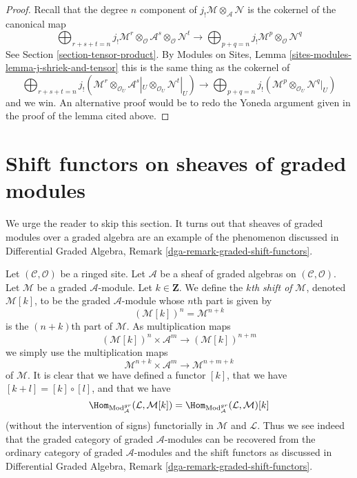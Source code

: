 \begin{proof}
Recall that the degree $n$ component of
$j_!\mathcal{M} \otimes_\mathcal{A} \mathcal{N}$ is the cokernel of
the canonical map
$$
\bigoplus\nolimits_{r + s + t = n}
j_!\mathcal{M}^r \otimes_\mathcal{O}
\mathcal{A}^s \otimes_\mathcal{O}
\mathcal{N}^t
\longrightarrow
\bigoplus\nolimits_{p + q = n}
j_!\mathcal{M}^p \otimes_\mathcal{O} \mathcal{N}^q
$$
See Section \ref{section-tensor-product}.
By Modules on Sites, Lemma \ref{sites-modules-lemma-j-shriek-and-tensor}
this is the same thing as the cokernel of
$$
\bigoplus\nolimits_{r + s + t = n}
j_!(\mathcal{M}^r \otimes_{\mathcal{O}_U}
\mathcal{A}^s|_U \otimes_{\mathcal{O}_U}
\mathcal{N}^t|_U)
\longrightarrow
\bigoplus\nolimits_{p + q = n}
j_!(\mathcal{M}^p \otimes_{\mathcal{O}_U} \mathcal{N}^q|_U)
$$
and we win. An alternative proof would be to redo the Yoneda
argument given in the proof of the lemma cited above.
\end{proof}








\section{Shift functors on sheaves of graded modules}
\label{section-shift}

\noindent
We urge the reader to skip this section. It turns out that sheaves
of graded modules over a graded algebra are an example of the phenomenon
discussed in
Differential Graded Algebra, Remark \ref{dga-remark-graded-shift-functors}.

\medskip\noindent
Let $(\mathcal{C}, \mathcal{O})$ be a ringed site.
Let $\mathcal{A}$ be a sheaf of graded algebras
on $(\mathcal{C}, \mathcal{O})$.
Let $\mathcal{M}$ be a graded $\mathcal{A}$-module. Let $k \in \mathbf{Z}$.
We define the {\it $k$th shift of} $\mathcal{M}$, denoted $\mathcal{M}[k]$,
to be the graded $\mathcal{A}$-module whose $n$th part is given by
$$
(\mathcal{M}[k])^n = \mathcal{M}^{n + k}
$$
is the $(n + k)$th part of $\mathcal{M}$. As multiplication maps
$$
(\mathcal{M}[k])^n \times \mathcal{A}^m
\longrightarrow
(\mathcal{M}[k])^{n + m}
$$
we simply use the multiplication maps
$$
\mathcal{M}^{n + k} \times \mathcal{A}^m
\longrightarrow
\mathcal{M}^{n + m + k}
$$
of $\mathcal{M}$. It is clear that we have defined a functor $[k]$,
that we have $[k + l] = [k] \circ [l]$, and that we have
$$
\Hom_{\text{Mod}^{gr}_\mathcal{A}}(\mathcal{L}, \mathcal{M}[k]) =
\Hom_{\text{Mod}^{gr}_\mathcal{A}}(\mathcal{L}, \mathcal{M})[k]
$$
(without the intervention of signs)
functorially in $\mathcal{M}$ and $\mathcal{L}$.
Thus we see indeed that the graded category of graded $\mathcal{A}$-modules
can be recovered from the ordinary category of graded $\mathcal{A}$-modules
and the shift functors as discussed in 
Differential Graded Algebra, Remark \ref{dga-remark-graded-shift-functors}.

